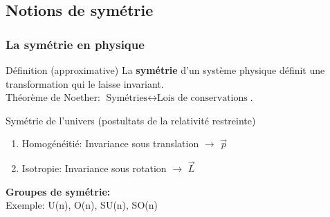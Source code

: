 \documentclass[handout]{beamer}
\begin{document}
\subsection{Notions de symétrie}
\begin{frame}\frametitle{La symétrie en physique}
\begin{block}{Définition (approximative)}
La \textbf{symétrie} d'un système physique définit une transformation qui le laisse invariant.\\
Théorème de Noether: $\text{Symétries} \leftrightarrow \text{Lois de conservations}$.
\end{block}


\begin{exampleblock}{Symétrie de l'univers (postultats de la relativité restreinte)}
\begin{enumerate}
\item Homogénéitié: Invariance sous translation $\rightarrow$ $\vec{p}$ 
\item Isotropie: Invariance sous rotation $\rightarrow$ $\vec{L}$
\end{enumerate}
\end{exampleblock}
\textbf{Groupes de symétrie:}\\ 
Exemple: U(n), O(n), SU(n), SO(n)
\end{frame}
\end{document}
